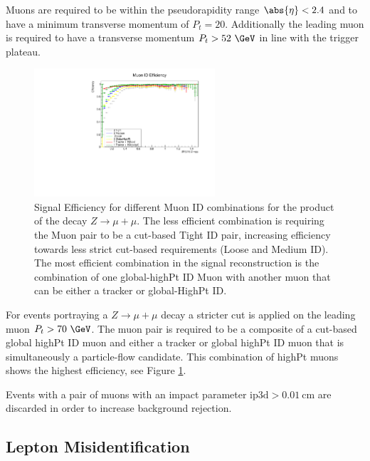 Muons are required to be within the pseudorapidity range $\abs{\eta}<2.4$ and
to have a minimum transverse momentum of $P_t=20$. Additionally the leading muon
is required to have a transverse momentum $P_t>52~\GeV$ in line with
the trigger plateau.

\begin{figure}[tph]
  \centering
  \includegraphics[width=0.6\textwidth]{fig/LeptonIDStudies/MuonIDEfficiency.pdf}
  \caption{Signal Efficiency for different Muon ID combinations for the product of
    the decay $Z\rightarrow\mu+\mu$. The less efficient combination is requiring
    the Muon pair to be a cut-based Tight ID pair, increasing efficiency towards less
    strict cut-based requirements (Loose and Medium ID). The most efficient combination in
    the signal reconstruction is the combination of one global-highPt ID Muon
    with another muon that can be either a tracker or global-HighPt ID.}
  \label{fig:MuonIDEfficiency}
\end{figure}

For events portraying a $Z\rightarrow\mu+\mu$ decay a stricter cut is applied on the
leading muon $P_{t}>70~\GeV$. The muon pair is required to be a composite of a
cut-based global highPt ID muon and either a tracker or global highPt ID muon
that is simultaneously a particle-flow candidate. This combination of highPt
muons shows the highest efficiency, see Figure \ref{fig:MuonIDEfficiency}.

Events with a pair of muons with an impact parameter $\mathrm{ip3d}>0.01~\mathrm{cm}$ are
discarded in order to increase background rejection.



\subsection{Lepton Misidentification}


